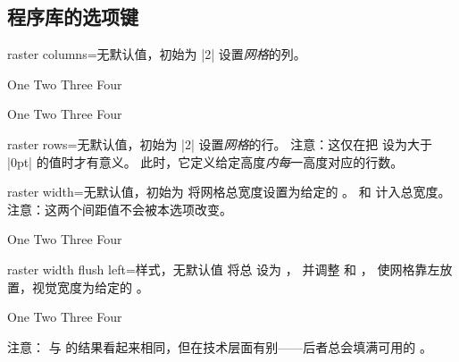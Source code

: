 \clearpage
\subsection{程序库的选项键}\label{subsec:raster_options}

\begin{docTcbKey}[][doc new=2014-11-10]{raster columns}{=}{无默认值，初始为 |2|}
  设置\emph{网格}的列。
\begin{dispExample}
\begin{tcbitemize}[raster columns=3,
  size=small,colframe=red!50!black,colback=red!10!white]
  \tcbitem One
  \tcbitem Two
  \tcbitem Three
  \tcbitem Four
\end{tcbitemize}
\begin{tcbitemize}[raster columns=4,
  size=small,colframe=blue!50!black,colback=blue!10!white]
  \tcbitem One
  \tcbitem Two
  \tcbitem Three
  \tcbitem Four
\end{tcbitemize}
\end{dispExample}
\end{docTcbKey}

\begin{docTcbKey}[][doc new=2014-11-10]{raster rows}{=}{无默认值，初始为 |2|}
  设置\emph{网格}的行。
  注意：这仅在把  设为大于 |0pt| 的值时才有意义。
  此时，它定义给定高度\emph{内}\emph{每}一高度对应的行数。
\end{docTcbKey}


\begin{docTcbKey}[][doc new=2014-11-10]{raster width}{=}{无默认值，初始为 }
  将网格总宽度设置为给定的 。
   和  计入总宽度。
  注意：这两个间距值不会被本选项改变。
\begin{dispExample}
\begin{tcbitemize}[raster width=\linewidth/2,
  size=small,colframe=red!50!black,colback=red!10!white]
  \tcbitem One
  \tcbitem Two
  \tcbitem Three
  \tcbitem Four
\end{tcbitemize}
\end{dispExample}
\end{docTcbKey}


\clearpage
\begin{docTcbKey}[][doc new=2018-11-30]{raster width flush left}{=}{样式，无默认值}
  将总  设为 ，
  并调整  和 ，
  使网格靠左放置，视觉宽度为给定的 。
\begin{dispExample}
\begin{tcbitemize}[raster width flush left=\linewidth/2,
  size=small,colframe=red!50!black,colback=red!10!white]
  \tcbitem One
  \tcbitem Two
  \tcbitem Three
  \tcbitem Four
\end{tcbitemize}
\end{dispExample}
注意： 与 
的结果看起来相同，但在技术层面有别——后者总会填满可用的 。
\end{docTcbKey}


